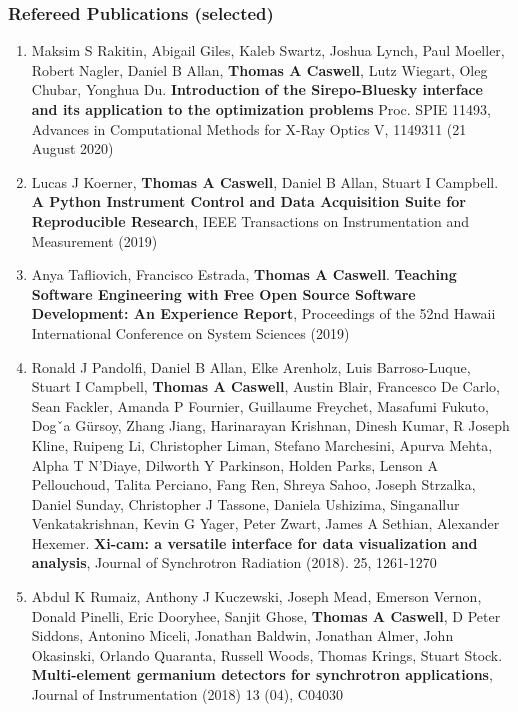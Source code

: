 \documentclass[12pt]{article}
\numberwithin{page}{section}
\begin{document}
\subsubsection*{Refereed Publications (selected)}

\begin{enumerate}[noitemsep]
    \item Maksim S Rakitin, Abigail Giles, Kaleb Swartz, Joshua Lynch,
      Paul Moeller, Robert Nagler, Daniel B Allan, \textbf{Thomas A Caswell},
      Lutz Wiegart, Oleg Chubar, Yonghua Du. \textbf{Introduction of
        the Sirepo-Bluesky interface and its application to the
        optimization problems} Proc. SPIE 11493, Advances in
      Computational Methods for X-Ray Optics V, 1149311 (21 August
      2020)

  \item Lucas J Koerner, \textbf{Thomas A Caswell}, Daniel B Allan,
    Stuart I Campbell. \textbf{A Python Instrument Control and Data
      Acquisition Suite for Reproducible Research}, IEEE Transactions
    on Instrumentation and Measurement (2019)

  \item Anya Tafliovich, Francisco Estrada, \textbf{Thomas A Caswell}.
    \textbf{Teaching Software Engineering with Free Open Source
      Software Development: An Experience Report}, Proceedings of the
    52nd Hawaii International Conference on System Sciences (2019)

  \item Ronald J Pandolfi, Daniel B Allan, Elke Arenholz, Luis
    Barroso-Luque, Stuart I Campbell, \textbf{Thomas A Caswell},
    Austin Blair, Francesco De Carlo, Sean Fackler, Amanda P Fournier,
    Guillaume Freychet, Masafumi Fukuto, Dogˇa Gürsoy, Zhang Jiang,
    Harinarayan Krishnan, Dinesh Kumar, R Joseph Kline, Ruipeng Li,
    Christopher Liman, Stefano Marchesini, Apurva Mehta, Alpha T
    N'Diaye, Dilworth Y Parkinson, Holden Parks, Lenson A Pellouchoud,
    Talita Perciano, Fang Ren, Shreya Sahoo, Joseph Strzalka, Daniel
    Sunday, Christopher J Tassone, Daniela Ushizima, Singanallur
    Venkatakrishnan, Kevin G Yager, Peter Zwart, James A Sethian,
    Alexander Hexemer. \textbf{Xi-cam: a versatile interface for data
      visualization and analysis}, Journal of Synchrotron Radiation
    (2018). 25, 1261-1270

  \item Abdul K Rumaiz, Anthony J Kuczewski, Joseph Mead, Emerson
    Vernon, Donald Pinelli, Eric Dooryhee, Sanjit Ghose,
    \textbf{Thomas A Caswell}, D Peter Siddons, Antonino Miceli,
    Jonathan Baldwin, Jonathan Almer, John Okasinski, Orlando
    Quaranta, Russell Woods, Thomas Krings, Stuart Stock.
    \textbf{Multi-element germanium detectors for synchrotron
      applications}, Journal of Instrumentation (2018) 13 (04), C04030


\end{enumerate}
\end{document}

